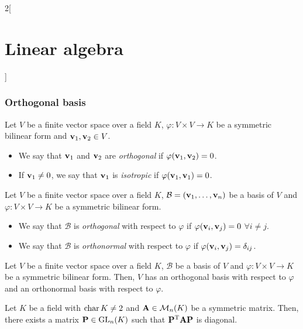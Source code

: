 \documentclass[../../../main.tex]{subfiles}
\begin{document}
\begin{multicols}{2}[\section{Linear algebra}]
  \subsubsection{Orthogonal basis}
  \begin{definition}\label{LA_isotrop}
    Let $V$ be a finite vector space over a field $K$, $\varphi:V\times V\rightarrow K$ be a symmetric bilinear form and $\boldsymbol{\mathrm{v}}_1,\boldsymbol{\mathrm{v}}_2\in V$.
    \begin{itemize}
      \item We say that $\boldsymbol{\mathrm{v}}_1$ and $\boldsymbol{\mathrm{v}}_2$ are \emph{orthogonal} if $\varphi(\boldsymbol{\mathrm{v}}_1,\boldsymbol{\mathrm{v}}_2)=0$.
      \item If $\boldsymbol{\mathrm{v}}_1\ne 0$, we say that $\boldsymbol{\mathrm{v}}_1$ is \emph{isotropic} if $\varphi(\boldsymbol{\mathrm{v}}_1,\boldsymbol{\mathrm{v}}_1)=0$.
    \end{itemize}
  \end{definition}
  \begin{definition}
    Let $V$ be a finite vector space over a field $K$, $\mathcal{B}=(\boldsymbol{\mathrm{v}}_1,\ldots,\boldsymbol{\mathrm{v}}_n)$ be a basis of $V$ and $\varphi:V\times V\rightarrow K$ be a symmetric bilinear form.
    \begin{itemize}
      \item We say that $\mathcal{B}$ is \emph{orthogonal} with respect to $\varphi$ if $\varphi(\boldsymbol{\mathrm{v}}_i,\boldsymbol{\mathrm{v}}_j)=0$ $\forall i\ne j$.
      \item We say that $\mathcal{B}$ is \emph{orthonormal} with respect to $\varphi$ if $\varphi(\boldsymbol{\mathrm{v}}_i,\boldsymbol{\mathrm{v}}_j)=\delta_{ij}$.
    \end{itemize}
  \end{definition}
  \begin{theorem}
    Let $V$ be a finite vector space over a field $K$, $\mathcal{B}$ be a basis of $V$ and $\varphi:V\times V\rightarrow K$ be a symmetric bilinear form. Then, $V$ has an orthogonal basis with respect to $\varphi$ and an orthonormal basis with respect to $\varphi$.
  \end{theorem}
  \begin{corollary}
    Let $K$ be a field with $\operatorname{char} K\ne 2$ and $\boldsymbol{\mathrm{A}}\in\mathcal{M}_n(K)$ be a symmetric matrix. Then, there exists a matrix $\boldsymbol{\mathrm{P}}\in\mathrm{GL}_n(K)$ such that $\vb{P}^{\mathrm{T}}\boldsymbol{\mathrm{A}}\boldsymbol{\mathrm{P}}$ is diagonal.
  \end{corollary}

\end{multicols}
\end{document}
